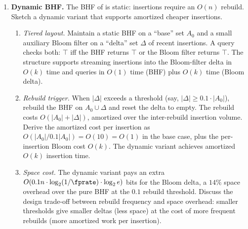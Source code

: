 \begin{enumerate}
\item \exstarstarstar
\label{ex:ch14-10}
\textbf{Dynamic BHF.}
The BHF of  is static: insertions require an $O(n)$
rebuild. Sketch a dynamic variant that supports amortized cheaper
insertions.
\begin{enumerate}
  \item[(a)] \emph{Tiered layout.} Maintain a static BHF on a
    ``base'' set $A_0$ and a small auxiliary Bloom filter on a
    ``delta'' set $\Delta$ of recent insertions. A query checks
    both: $\top$ iff the BHF returns $\top$ or the Bloom filter
    returns $\top$. The structure supports streaming insertions
    into the Bloom-filter delta in $O(k)$ time and queries in
    $O(1)$ time (BHF) plus $O(k)$ time (Bloom delta).
  \item[(b)] \emph{Rebuild trigger.} When $|\Delta|$ exceeds a
    threshold (say, $|\Delta| \ge 0.1 \cdot |A_0|$), rebuild the
    BHF on $A_0 \cup \Delta$ and reset the delta to empty. The
    rebuild costs $O(|A_0| + |\Delta|)$, amortized over the
    inter-rebuild insertion volume. Derive the amortized cost per
    insertion as $O(|A_0| / 0.1 |A_0|) = O(10) = O(1)$ in the
    base case, plus the per-insertion Bloom cost $O(k)$. The
    dynamic variant achieves amortized $O(k)$ insertion time.
  \item[(c)] \emph{Space cost.} The dynamic variant pays an extra
    $O(0.1 n \cdot \log_2(1/\fprate) \cdot \log_2 e)$ bits for the
    Bloom delta, a $14\%$ space overhead over the pure BHF at the
    $0.1$ rebuild threshold. Discuss the design trade-off between
    rebuild frequency and space overhead: smaller thresholds give
    smaller deltas (less space) at the cost of more frequent
    rebuilds (more amortized work per insertion).
\end{enumerate}


\end{enumerate}
